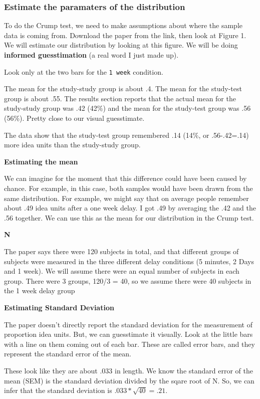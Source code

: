 \documentclass[]{book}
\begin{document}
\subsubsection{Estimate the paramaters of the
distribution}\label{estimate-the-paramaters-of-the-distribution}

To do the Crump test, we need to make assumptions about where the sample
data is coming from. Download the paper from the link, then look at
Figure 1. We will estimate our distribution by looking at this figure.
We will be doing \textbf{informed guesstimation} (a real word I just
made up).

Look only at the two bars for the \texttt{1\ week} condition.

The mean for the study-study group is about .4. The mean for the
study-test group is about .55. The results section reports that the
actual mean for the study-study group was .42 (42\%) and the mean for
the study-test group was .56 (56\%). Pretty close to our visual
guesstimate.

The data show that the study-test group remembered .14 (14\%, or
.56-.42=.14) more idea units than the study-study group.

\textbf{Estimating the mean}

We can imagine for the moment that this difference could have been
caused by chance. For example, in this case, both samples would have
been drawn from the same distribution. For example, we might say that on
average people remember about .49 idea units after a one week delay. I
got .49 by averaging the .42 and the .56 together. We can use this as
the mean for our distribution in the Crump test.

\textbf{N}

The paper says there were 120 subjects in total, and that different
groups of subjects were measured in the three different delay conditions
(5 minutes, 2 Days and 1 week). We will assume there were an equal
number of subjects in each group. There were 3 groups, 120/3 = 40, so we
assume there were 40 subjects in the 1 week delay group

\textbf{Estimating Standard Deviation}

The paper doesn't directly report the standard deviation for the
measurement of proportion idea units. But, we can guesstimate it
visually. Look at the little bars with a line on them coming out of each
bar. These are called error bars, and they represent the standard error
of the mean.

These look like they are about .033 in length. We know the standard
error of the mean (SEM) is the standard deviation divided by the sqare
root of N. So, we can infer that the standard deviation is
\(.033 * \sqrt{40} = .21\).
\end{document}
